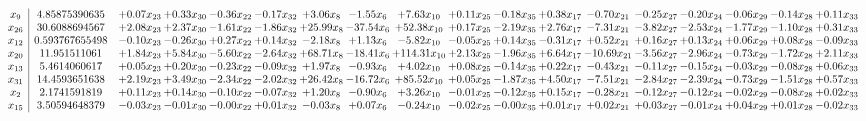 \documentclass[9pt]{article}
\begin{document}
 \[\begin{array}{c| c c@{\hskip 2pt} c@{\hskip 2pt} c@{\hskip 2pt} c@{\hskip 2pt} c@{\hskip 2pt} c@{\hskip 2pt} c@{\hskip 2pt} c@{\hskip 2pt} c@{\hskip 2pt} c@{\hskip 2pt} c@{\hskip 2pt} c@{\hskip 2pt} c@{\hskip 2pt} c@{\hskip 2pt} c@{\hskip 2pt} c@{\hskip 2pt} }
 x_{9}   &  4.85875390635 & +  0.07 x_{23} & +  0.33 x_{30} & -0.36 x_{22} & -0.17 x_{32} & +  3.06 x_{8} & -1.55 x_{6} & +  7.63 x_{10} & +  0.11 x_{25} & -0.18 x_{35} & +  0.38 x_{17} & -0.70 x_{21} & -0.25 x_{27} & -0.20 x_{24} & -0.06 x_{29} & -0.14 x_{28} & +  0.11 x_{33}\\
 x_{26}   &  30.6088694567 & +  2.08 x_{23} & +  2.37 x_{30} & -1.61 x_{22} & -1.86 x_{32} & + 25.99 x_{8} & -37.54 x_{6} & + 52.38 x_{10} & +  0.17 x_{25} & -2.19 x_{35} & +  2.76 x_{17} & -7.31 x_{21} & -3.82 x_{27} & -2.53 x_{24} & -1.77 x_{29} & -1.10 x_{28} & +  0.31 x_{33}\\
 x_{12}   &  0.593767655498 & -0.10 x_{23} & -0.26 x_{30} & +  0.27 x_{22} & +  0.14 x_{32} & -2.18 x_{8} & +  1.13 x_{6} & -5.82 x_{10} & -0.05 x_{25} & +  0.14 x_{35} & -0.31 x_{17} & +  0.52 x_{21} & +  0.16 x_{27} & +  0.13 x_{24} & +  0.06 x_{29} & +  0.08 x_{28} & -0.09 x_{33}\\
 x_{20}   &  11.951511061 & +  1.84 x_{23} & +  5.84 x_{30} & -5.60 x_{22} & -2.64 x_{32} & + 68.71 x_{8} & -18.41 x_{6} & + 114.31 x_{10} & +  2.13 x_{25} & -1.96 x_{35} & +  6.64 x_{17} & -10.69 x_{21} & -3.56 x_{27} & -2.96 x_{24} & -0.73 x_{29} & -1.72 x_{28} & +  2.11 x_{33}\\
 x_{13}   &  5.4614060617 & +  0.05 x_{23} & +  0.20 x_{30} & -0.23 x_{22} & -0.09 x_{32} & +  1.97 x_{8} & -0.93 x_{6} & +  4.02 x_{10} & +  0.08 x_{25} & -0.14 x_{35} & +  0.22 x_{17} & -0.43 x_{21} & -0.11 x_{27} & -0.15 x_{24} & -0.03 x_{29} & -0.08 x_{28} & +  0.06 x_{33}\\
 x_{31}   &  14.4593651638 & +  2.19 x_{23} & +  3.49 x_{30} & -2.34 x_{22} & -2.02 x_{32} & + 26.42 x_{8} & -16.72 x_{6} & + 85.52 x_{10} & +  0.05 x_{25} & -1.87 x_{35} & +  4.50 x_{17} & -7.51 x_{21} & -2.84 x_{27} & -2.39 x_{24} & -0.73 x_{29} & -1.51 x_{28} & +  0.57 x_{33}\\
 x_{2}   &  2.1741591819 & +  0.11 x_{23} & +  0.14 x_{30} & -0.10 x_{22} & -0.07 x_{32} & +  1.20 x_{8} & -0.90 x_{6} & +  3.26 x_{10} & -0.01 x_{25} & -0.12 x_{35} & +  0.15 x_{17} & -0.28 x_{21} & -0.12 x_{27} & -0.12 x_{24} & -0.02 x_{29} & -0.08 x_{28} & +  0.02 x_{33}\\
 x_{15}   &  3.50594648379 & -0.03 x_{23} & -0.01 x_{30} & -0.00 x_{22} & +  0.01 x_{32} & -0.03 x_{8} & +  0.07 x_{6} & -0.24 x_{10} & -0.02 x_{25} & -0.00 x_{35} & +  0.01 x_{17} & +  0.02 x_{21} & +  0.03 x_{27} & -0.01 x_{24} & +  0.04 x_{29} & +  0.01 x_{28} & -0.02 x_{33}\\

\end{array}\]
\end{document}
